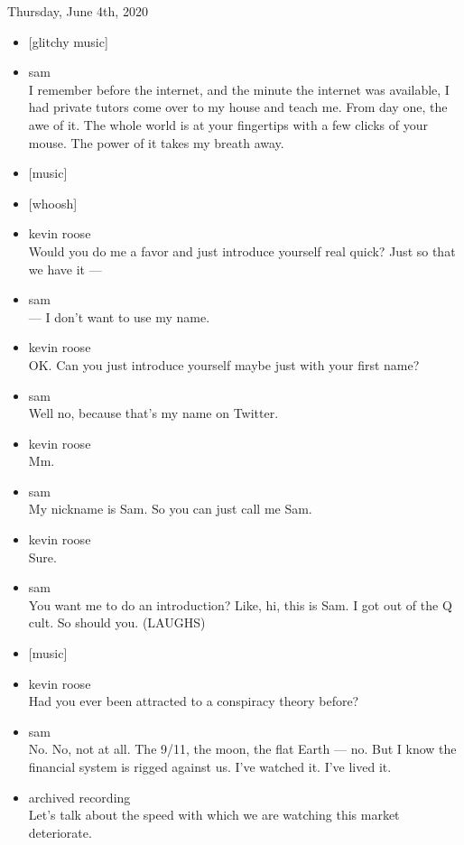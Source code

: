 Thursday, June 4th, 2020

\begin{itemize}
\item
  {[}glitchy music{]}
\item
  sam\\
  I remember before the internet, and the minute the internet was
  available, I had private tutors come over to my house and teach me.
  From day one, the awe of it. The whole world is at your fingertips
  with a few clicks of your mouse. The power of it takes my breath away.
\item
  {[}music{]}
\item
  {[}whoosh{]}
\item
  kevin roose\\
  Would you do me a favor and just introduce yourself real quick? Just
  so that we have it ---
\item
  sam\\
  --- I don't want to use my name.
\item
  kevin roose\\
  OK. Can you just introduce yourself maybe just with your first name?
\item
  sam\\
  Well no, because that's my name on Twitter.
\item
  kevin roose\\
  Mm.
\item
  sam\\
  My nickname is Sam. So you can just call me Sam.
\item
  kevin roose\\
  Sure.
\item
  sam\\
  You want me to do an introduction? Like, hi, this is Sam. I got out of
  the Q cult. So should you. (LAUGHS)
\item
  {[}music{]}
\item
  kevin roose\\
  Had you ever been attracted to a conspiracy theory before?
\item
  sam\\
  No. No, not at all. The 9/11, the moon, the flat Earth --- no. But I
  know the financial system is rigged against us. I've watched it. I've
  lived it.
\item
  archived recording\\
  Let's talk about the speed with which we are watching this market
  deteriorate.
\end{itemize}

